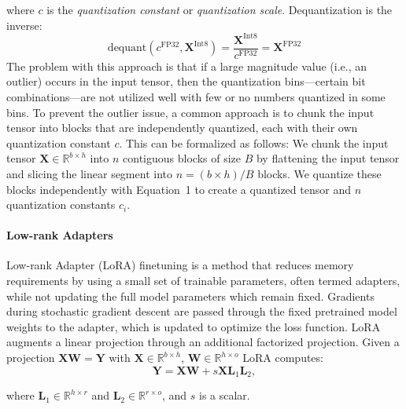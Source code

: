 \documentclass{article}
\begin{document}
\noindent
where $c$ is the {\em quantization constant} or {\em quantization scale}. Dequantization is the inverse:
\begin{equation}
    \text{dequant}(c^{\text{FP32}}, \mathbf{X}^{\text{Int8}}) = \frac{\mathbf{X}^{\text{Int8}}}{c^{\text{FP32}}} = \mathbf{X}^{\text{FP32}}
\end{equation}
The problem with this approach is that if a large magnitude value (i.e., an outlier) occurs in the input tensor, then the quantization bins—certain bit combinations—are not utilized well with few or no numbers quantized in some bins. To prevent the outlier issue, a common approach is to chunk the input tensor into blocks that are independently quantized, each with their own quantization constant $c$. This can be formalized as follows: We chunk the input tensor  $\mathbf{X}\in \mathbb{R}^{b\times h}$ into $n$ contiguous blocks of size $B$ by flattening the input tensor and slicing the linear segment into ${n = ({b\times h}
)/{B} }$ blocks. We quantize these blocks independently with Equation~1 to create a quantized tensor and $n$ quantization constants $c_i$.

\paragraph{Low-rank Adapters} Low-rank Adapter (LoRA) finetuning \citep{hu2021lora} is a method that reduces memory requirements by using a small set of trainable parameters, often termed adapters, while not updating the full model parameters which remain fixed. Gradients during stochastic gradient descent are passed through the fixed pretrained model weights to the adapter, which is updated to optimize the loss function. LoRA augments a linear projection through an additional factorized projection. Given a projection ${\mathbf{X} \mathbf{W} = \mathbf{Y}}$ with $\mathbf{X}\in  \mathbb{R}^{b\times h}$, $\mathbf{W}\in  \mathbb{R}^{h\times o}$ LoRA computes:
\begin{equation}
    \mathbf{Y} = \mathbf{X}\mathbf{W} + s\mathbf{X}\mathbf{L}_1\mathbf{L}_2,
\end{equation}

\noindent
where $\mathbf{L}_1\in  \mathbb{R}^{h\times r}$ and $\mathbf{L}_2\in  \mathbb{R}^{r\times o}$, and $s$ is a scalar.
\end{document}
